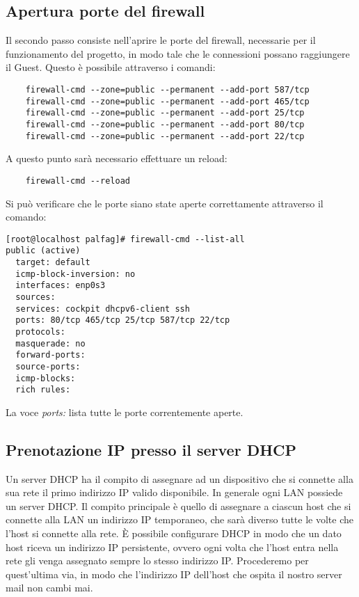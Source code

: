 \subsection{Apertura porte del firewall}

Il secondo passo consiste nell’aprire le porte del firewall, necessarie per il funzionamento del progetto, 
in modo tale che le connessioni possano raggiungere il Guest. Questo è possibile attraverso i comandi:

\begin{verbatim}
    firewall-cmd --zone=public --permanent --add-port 587/tcp
    firewall-cmd --zone=public --permanent --add-port 465/tcp
    firewall-cmd --zone=public --permanent --add-port 25/tcp
    firewall-cmd --zone=public --permanent --add-port 80/tcp
    firewall-cmd --zone=public --permanent --add-port 22/tcp
\end{verbatim}

A questo punto sarà necessario effettuare un reload:

\begin{verbatim}
    firewall-cmd --reload
\end{verbatim}

Si può verificare che le porte siano state aperte correttamente attraverso il comando:
\begin{verbatim}
[root@localhost palfag]# firewall-cmd --list-all
public (active)
  target: default
  icmp-block-inversion: no
  interfaces: enp0s3
  sources: 
  services: cockpit dhcpv6-client ssh
  ports: 80/tcp 465/tcp 25/tcp 587/tcp 22/tcp
  protocols: 
  masquerade: no
  forward-ports: 
  source-ports: 
  icmp-blocks: 
  rich rules: 
\end{verbatim}

La voce \textit{ports:} lista tutte le porte correntemente aperte.

\subsection{Prenotazione IP presso il server DHCP}
Un server DHCP ha il compito di assegnare ad un dispositivo che si connette alla sua rete il primo indirizzo IP 
valido disponibile. In generale ogni LAN possiede un server DHCP. 
Il compito principale è quello di assegnare a ciascun host che si connette alla LAN un indirizzo IP temporaneo, 
che sarà diverso tutte le volte che l’host si connette alla rete. 
È possibile configurare DHCP in modo che un dato host riceva un indirizzo IP persistente, 
ovvero ogni volta che l’host entra nella rete gli venga assegnato sempre lo stesso indirizzo IP. 
Procederemo per quest’ultima via, in modo che l’indirizzo IP dell’host che ospita il nostro server mail non cambi mai.

